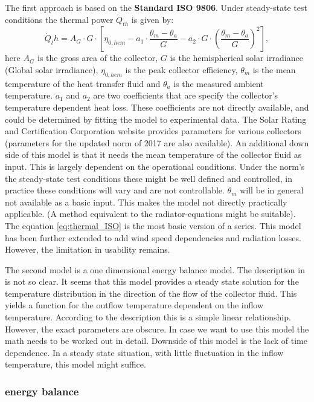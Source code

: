 The first approach is based on the \textbf{Standard ISO 9806}. Under steady-state test conditions the thermal power $\dot{Q}_{th}$ is given by:
\begin{equation}
\dot{Q}_th = A_G\cdot G\cdot \left[\eta_{0,hem} - a_1 \cdot \frac{\theta_m - \theta_a}{G} - a_2 \cdot G \cdot \left(\frac{\theta_m - \theta_a}{G}\right)^2 \right] ,
\label{eq:thermal_ISO}
\end{equation} 
here $A_G$ is the gross area of the collector,  $G$ is the hemispherical solar irradiance (Global solar irradiance), $\eta_{0,hem}$ is the peak collector efficiency, $\theta_m$ is the mean temperature of the heat transfer fluid and $\theta_a$ is the measured ambient temperature. $a_1$ and $a_2$ are two coefficients that are specify the collector's temperature dependent heat loss. These coefficients are not directly available, and could be determined by fitting the model to experimental data. The Solar Rating and Certification Corporation website \cite{srcc} provides parameters for various collectors (parameters for the updated norm of 2017 are also available).
An additional down side of this model is that it needs the mean temperature of the collector fluid as input. This is largely dependent on the operational conditions. Under the norm's  the steady-state test conditions these might be well defined and controlled, in practice these conditions will vary and are not controllable. $\theta_m$ will be in general not available as a basic input. This makes the model not directly practically applicable. (A method equivalent to the radiator-equations might be suitable).   
The equation \ref{eq:thermal_ISO} is the most basic version of a series. This model has been further extended to add wind speed dependencies and radiation losses. However, the limitation in usability remains. 


The second model is a one dimensional energy balance model. The description in \cite{SHC2020PVT} is not so clear. It seems that this model provides a steady state solution for the temperature distribution in the direction of the flow of the collector fluid. This yields a function for the outflow temperature dependent on the inflow temperature. According to the description this is a simple linear relationship. However, the exact parameters are obscure. In case we want to use this model the math needs to be worked out in detail. Downside of this model is the lack of time dependence. In a steady state situation, with little fluctuation in the inflow temperature, this model might suffice. 

 
\subsubsection{energy balance}





